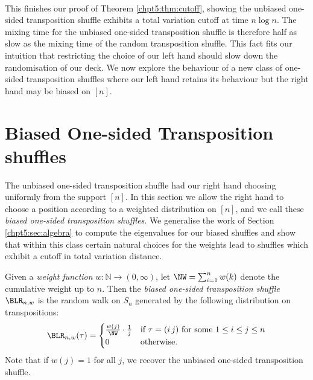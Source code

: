 \documentclass[11pt]{report}
\begin{document}
\paragraph{}
This finishes our proof of Theorem \ref{chpt5:thm:cutoff}, showing the unbiased one-sided transposition shuffle exhibits a total variation cutoff at time $n\log n$. The mixing time for the unbiased one-sided transposition shuffle is therefore half as slow as the mixing time of the random transposition shuffle. This fact fits our intuition that restricting the choice of our left hand should slow down the randomisation of our deck. We now explore the behaviour of a new class of one-sided transposition shuffles where our left hand retains its behaviour but the right hand may be biased on $[n]$. 











\section{Biased One-sided Transposition shuffles}
\label{chpt5:sec:biased}

The unbiased one-sided transposition shuffle had our right hand choosing uniformly from the support $[n]$. In this section we allow the right hand to choose a position according to a weighted distribution on $[n]$, and we call these \emph{biased one-sided transposition shuffles}. We generalise the work of Section \ref{chpt5:sec:algebra} to compute the eigenvalues for our biased shuffles and show that within this class certain natural choices for the weights lead to shuffles which exhibit a cutoff in total variation distance.













\begin{defn}
	\label{chpt5:def:biasedLR}
	Given a \emph{weight function} $w:\mathbb{N} \rightarrow (0,\infty)$, let $\NW = \sum_{i=1}^{n} w(k)$ denote the cumulative weight up to $n$. Then the \emph{biased one-sided transposition shuffle} $\BLR_{n,w}$ is the random walk on $S_n$ generated by the following distribution on transpositions:
	\begin{eqnarray}
	\BLR_{n,w}(\tau) = 
	\begin{cases}
	\frac{w(j)}{\NW}\cdot\frac{1}{j} &  \text{if } \tau = (i\,j) 
	\text{ for some } 
	1\leq i 
	\leq j 
	\leq n\\
	0 & \text{otherwise.}
	\end{cases}
	\end{eqnarray}
	Note that if $w(j)=1$ for all $j$, we recover the unbiased one-sided transposition shuffle.
\end{defn}
\end{document}
